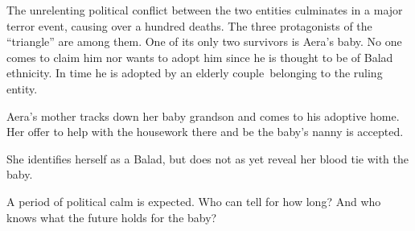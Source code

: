 \documentclass[
  spinewidth=0.8325in,
  coverwidth=6in,
  coverheight=9in,
  marklength=0.125in,
  bleedwidth=0.125in,
  11pt
]{bookcover}
\begin{document}
\begin{bookcover}
{{The unrelenting political conflict between the two entities culminates
in a major terror event, causing over a hundred deaths. The three
protagonists of the ``triangle'' are among them. One of its only two
survivors is Aera's baby. No one comes to claim him nor wants to adopt
him since he is thought to be of Balad ethnicity. In time he is
adopted by an elderly couple~belonging to the ruling entity.

Aera's mother tracks down her baby grandson and comes to his adoptive
home. Her offer to help with the housework there and be the baby's
nanny is accepted.

\bigskip

She identifies herself as a Balad, but does not as yet reveal her
blood tie with the baby.

A period of political calm is expected. Who can tell for how long?
And who knows what the future holds for the baby?
    }


}


\end{bookcover}
\end{document}
